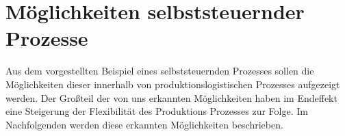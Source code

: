\section{Möglichkeiten selbststeuernder Prozesse}
\label{Moeglichkeiten}

Aus dem vorgestellten Beispiel eines selbststeuernden Prozesses sollen die Möglichkeiten dieser innerhalb von 
produktionslogistischen Prozesses aufgezeigt werden. Der Großteil der von uns erkannten Möglichkeiten haben im Endeffekt 
eine Steigerung der Flexibilität des Produktions Prozesses zur Folge. Im Nachfolgenden werden diese erkannten Möglichkeiten 
beschrieben.



